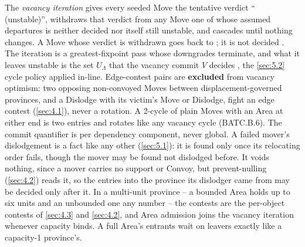 \documentclass[12pt,a4paper]{article}
\begin{document}
\begin{itemize}
The \emph{vacancy iteration} gives every seeded Move the tentative verdict `` (unstable)'', withdraws that verdict from any Move one of whose assumed departures is neither decided nor itself still unstable, and cascades until nothing changes.
A Move whose verdict is withdrawn goes back to ; it is not decided .
The iteration is a greatest-fixpoint pass whose downgrades terminate, and what it leaves unstable is the set $U_\Lambda$ that the vacancy commit $V$ decides , the \cref{sec:5.2} cycle policy applied in-line.
Edge-contest pairs are \textbf{excluded} from vacancy optimism: two opposing non-convoyed Moves between displacement-governed provinces, and a Dislodge with its victim's Move or Dislodge, fight an edge contest (\cref{sec:4.1}), never a rotation.
A 2-cycle of plain Moves with an Area at either end is two entries and rotates like any vacancy cycle (BATC.B.6).
The commit quantifier is per dependency component, never global.
A failed mover's dislodgement is a fact like any other (\cref{sec:5.1}): it is found only once its relocating order fails, though the mover may be found not dislodged before.
It voids nothing, since a mover carries no support or Convoy, but prevent-nulling (\cref{sec:4.2}) reads it, so the entries into the province its dislodger came from may be decided only after it.
In a multi-unit province -- a bounded Area holds up to six units and an unbounded one any number -- the contests are the per-object contests of \cref{sec:4.3} and \cref{sec:4.2}, and Area admission joins the vacancy iteration whenever capacity binds.
A full Area's entrants wait on leavers exactly like a capacity-1 province's.
\end{itemize}
\end{document}
